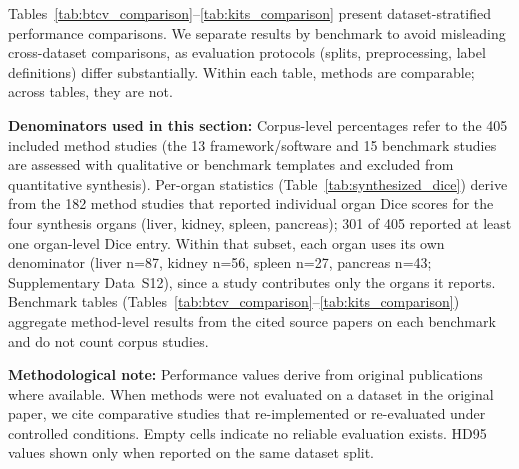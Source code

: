Tables~\ref{tab:btcv_comparison}--\ref{tab:kits_comparison} present dataset-stratified performance comparisons. We separate results by benchmark to avoid misleading cross-dataset comparisons, as evaluation protocols (splits, preprocessing, label definitions) differ substantially. Within each table, methods are comparable; across tables, they are not.

\textbf{Denominators used in this section:} Corpus-level percentages refer to the 405 included method studies (the 13 framework/software and 15 benchmark studies are assessed with qualitative or benchmark templates and excluded from quantitative synthesis). Per-organ statistics (Table~\ref{tab:synthesized_dice}) derive from the 182 method studies that reported individual organ Dice scores for the four synthesis organs (liver, kidney, spleen, pancreas); 301 of 405 reported at least one organ-level Dice entry. Within that subset, each organ uses its own denominator (liver n=87, kidney n=56, spleen n=27, pancreas n=43; Supplementary Data~S12), since a study contributes only the organs it reports. Benchmark tables (Tables~\ref{tab:btcv_comparison}--\ref{tab:kits_comparison}) aggregate method-level results from the cited source papers on each benchmark and do not count corpus studies.

\textbf{Methodological note:} Performance values derive from original publications where available. When methods were not evaluated on a dataset in the original paper, we cite comparative studies that re-implemented or re-evaluated under controlled conditions. Empty cells indicate no reliable evaluation exists. HD95 values shown only when reported on the same dataset split.

